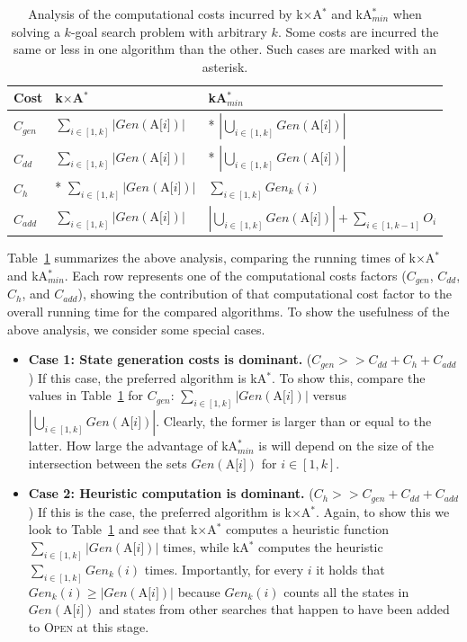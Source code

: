 \documentclass{aicom2e}
\newcommand{\kgs}{$k$-goal search}
\newcommand{\kastar}{kA$^*$}
\newcommand{\kastarmin}{kA$^*_{min}$}
\newcommand{\kxastar}{k$\times$A$^*$}
\newcommand{\astari}[1]{A[$#1$]}
\newcommand{\open}{\textsc{Open}}
\begin{document}
\begin{table}
	\begin{tabular}{|l|l|l|}
		\hline
		Cost 		& \kxastar{}									& \kastarmin \\ \hline
		$C_{gen}$	& $\sum_{i\in[1,k]} |Gen(\text{\astari{i}})|$		& * $|\bigcup_{i\in[1,k]} Gen(\text{\astari{i}})|$\\
		$C_{dd}$	& $\sum_{i\in[1,k]} |Gen(\text{\astari{i}})|$		& * $|\bigcup_{i\in[1,k]} Gen(\text{\astari{i}})|$\\
		$C_{h}$		& * $\sum_{i\in[1,k]} |Gen(\text{\astari{i}})|$		& $\sum_{i\in[1,k]} Gen_k(i)$\\
		$C_{add}$	& $\sum_{i\in[1,k]} |Gen(\text{\astari{i}})|$		& $|\bigcup_{i\in[1,k]} Gen(\text{\astari{i}})|
		+ \sum_{i\in[1,k-1]} O_i$ \\			
		\hline		
	\end{tabular}
	\caption{Analysis of the computational costs incurred by \kxastar{} and \kastarmin{} 
		when solving a \kgs{} problem with arbitrary $k$. 
		Some costs are incurred the same or less in one algorithm than the other. Such cases are marked with an asterisk. }
	\label{tab:time-analysis}	
\end{table}

Table~\ref{tab:time-analysis} summarizes the above analysis, comparing 
the running times of \kxastar{} and \kastarmin{}. Each row represents one of the computational costs factors ($C_{gen}$, $C_{dd}$, $C_{h}$, and $C_{add}$), showing the contribution of that computational cost factor to the overall running time for the compared algorithms. To show the usefulness of the above analysis, we consider some special cases.
\begin{itemize}
	\item {\bf Case 1: State generation costs is dominant.} ($C_{gen}>>C_{dd}+C_{h}+C_{add}$) 
	If this case, the preferred algorithm is \kastar{}. To show this, 
	compare the values in Table~\ref{tab:time-analysis} for $C_{gen}$: $\sum_{i\in[1,k]} |Gen(\text{\astari{i}})|$ 
	versus $|\bigcup_{i\in[1,k]} Gen(\text{\astari{i}})|$. Clearly, the former is larger than or equal to the latter. 
	How large the advantage of \kastarmin{} is will depend on the size of the intersection between the sets $Gen(\text{\astari{i}})$ for $i\in[1,k]$. 
	
	\item {\bf Case 2: Heuristic computation is dominant.} ($C_{h}>>C_{gen}+C_{dd}+C_{add}$) 
	If this is the case, the preferred algorithm is \kxastar{}. Again, to show this we look to Table~\ref{tab:time-analysis} and see that \kxastar{} computes a heuristic function  
	$\sum_{i\in[1,k]} |Gen(\text{\astari{i}})|$ times, while 
	\kastar{} computes the heuristic $\sum_{i\in[1,k]} Gen_k(i)$ times. 
	Importantly, for every $i$ it holds that $Gen_k(i)\geq |Gen(\text{\astari{i}})|$
	because $Gen_k(i)$ counts all the states in $Gen(\text{\astari{i}})$ 
	and states from other searches that happen to have been added to \open{} at this stage. 		
\end{itemize}
\end{document}
